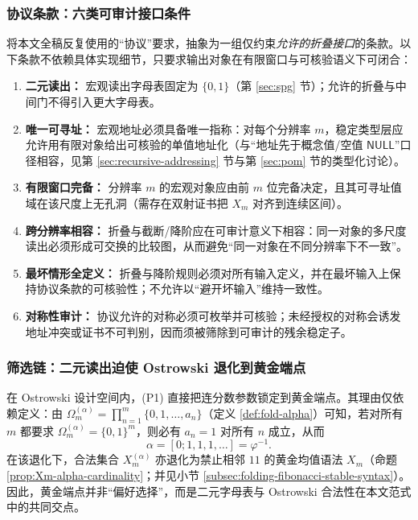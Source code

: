 \subsubsection{协议条款：六类可审计接口条件}
将本文全稿反复使用的“协议”要求，抽象为一组仅约束\emph{允许的折叠接口}的条款。以下条款不依赖具体实现细节，只要求输出对象在有限窗口与可核验语义下可闭合：
\begin{enumerate}
  \item[\textbf{(P1)}] \textbf{二元读出：} 宏观读出字母表固定为 \(\{0,1\}\)（第 \ref{sec:spg} 节）；允许的折叠与中间门不得引入更大字母表。
  \item[\textbf{(P2)}] \textbf{唯一可寻址：} 宏观地址必须具备唯一指称：对每个分辨率 \(m\)，稳定类型层应允许用有限对象给出可核验的单值地址化（与“地址先于概念值/空值 \(\mathsf{NULL}\)”口径相容，见第 \ref{sec:recursive-addressing} 节与第 \ref{sec:pom} 节的类型化讨论）。
  \item[\textbf{(P3)}] \textbf{有限窗口完备：} 分辨率 \(m\) 的宏观对象应由前 \(m\) 位完备决定，且其可寻址值域在该尺度上无孔洞（需存在双射证书把 \(X_m\) 对齐到连续区间）。
  \item[\textbf{(P4)}] \textbf{跨分辨率相容：} 折叠与截断/降阶应在可审计意义下相容：同一对象的多尺度读出必须形成可交换的比较图，从而避免“同一对象在不同分辨率下不一致”。
  \item[\textbf{(P5)}] \textbf{最坏情形全定义：} 折叠与降阶规则必须对所有输入定义，并在最坏输入上保持协议条款的可核验性；不允许以“避开坏输入”维持一致性。
  \item[\textbf{(P6)}] \textbf{对称性审计：} 协议允许的对称必须可枚举并可核验；未经授权的对称会诱发地址冲突或证书不可判别，因而须被筛除到可审计的残余稳定子。
\end{enumerate}

\subsubsection{筛选链：二元读出迫使 Ostrowski 退化到黄金端点}
在 Ostrowski 设计空间内，(P1) 直接把连分数参数锁定到黄金端点。其理由仅依赖定义：由 \(\Omega_m^{(\alpha)}=\prod_{n=1}^{m}\{0,1,\dots,a_n\}\)（定义 \ref{def:fold-alpha}）可知，若对所有 \(m\) 都要求 \(\Omega_m^{(\alpha)}=\{0,1\}^m\)，则必有 \(a_n=1\) 对所有 \(n\) 成立，从而
\[
\alpha=[0;1,1,1,\dots]=\varphi^{-1}.
\]
在该退化下，合法集合 \(X_m^{(\alpha)}\) 亦退化为禁止相邻 \(11\) 的黄金均值语法 \(X_m\)（命题 \ref{prop:Xm-alpha-cardinality}；并见小节 \ref{subsec:folding-fibonacci-stable-syntax}）。因此，黄金端点并非“偏好选择”，而是二元字母表与 Ostrowski 合法性在本文范式中的共同交点。

